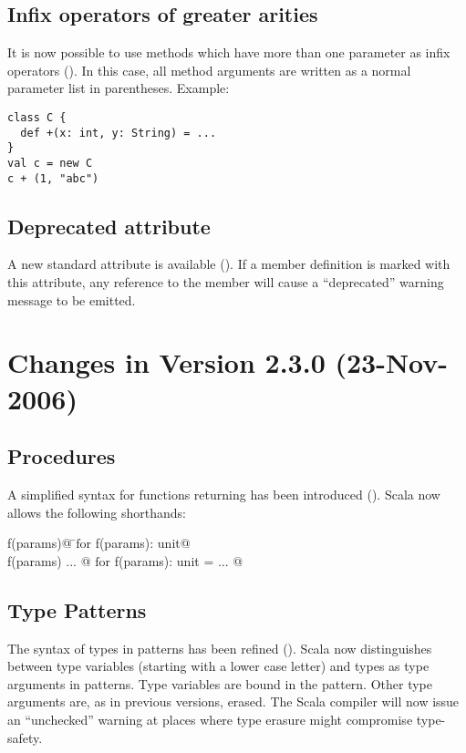 \subsection*{Infix operators of greater arities}

It is now possible to use methods which have more than one parameter
as infix operators (). In this case, all
method arguments are written as a normal parameter list in parentheses. Example:
\begin{lstlisting}
class C {
  def +(x: int, y: String) = ...
}
val c = new C
c + (1, "abc")
\end{lstlisting}

\subsection*{Deprecated attribute}

A new standard attribute \lstinline@deprecated@ is available (). If a
member definition is marked with this attribute, any reference to the
member will cause a ``deprecated'' warning message to be emitted.

\section{Changes in Version 2.3.0 (23-Nov-2006)}

\subsection*{Procedures} A simplified syntax for functions returning
\lstinline@unit@ has been introduced (). 
Scala now allows the following shorthands:

\begin{tabbing}
\lstinline@def f(params)@     \tab\tab\tab \=$\mbox{for}$  \tab
\lstinline@def f(params): unit@ \\
\lstinline@def f(params) { ... }@  \>$\mbox{for}$    \tab
\lstinline@def f(params): unit = { ... }@
\end{tabbing}

\subsection*{Type Patterns} The syntax of types in patterns has been 
refined (). Scala now distinguishes between
type variables (starting with a lower case letter) and types as type
arguments in patterns.  Type variables are bound in the pattern. Other
type arguments are, as in previous versions, erased. The Scala
compiler will now issue an ``unchecked'' warning at places where type
erasure might compromise type-safety.

